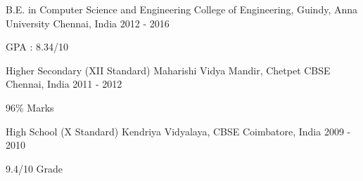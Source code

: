 

\begin{cventries}

  \cventry
    {B.E. in Computer Science and Engineering} %
    {College of Engineering, Guindy, Anna University} %
    {Chennai, India} %
    {2012 - 2016} %
    {
      \begin{cvitems} %
        \item {GPA : 8.34/10}
      \end{cvitems}
    }
  \cventry
    {Higher  Secondary  (XII  Standard)} %
    {Maharishi  Vidya  Mandir, Chetpet CBSE} %
    {Chennai, India} %
    {2011 - 2012} %
    {
      \begin{cvitems} %
        \item {96\% Marks}
      \end{cvitems}
    }
  \cventry
    {High  School  (X  Standard)} %
    {Kendriya  Vidyalaya, CBSE} %
    {Coimbatore, India} %
    {2009 - 2010} %
    {
      \begin{cvitems} %
        \item {9.4/10 Grade}
      \end{cvitems}
    }
\end{cventries}